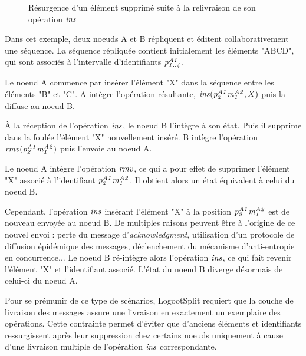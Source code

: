 \begin{figure}[!ht]
{
  }
  \caption{Résurgence d'un élément supprimé suite à la relivraison de son opération $\mathit{ins}$}
  \label{fig:why-exactly-once-delivery}
\end{figure}

Dans cet exemple, deux noeuds A et B répliquent et éditent collaborativement une séquence.
La séquence répliquée contient initialement les éléments "ABCD", qui sont associés à l'intervalle d'identifiants $\mathit{p}^{\mathit{A1}}_{\mathit{1..4}}$.

Le noeud A commence par insérer l'élément "X" dans la séquence entre les éléments "B" et "C".
A intègre l'opération résultante, $\mathit{ins}(\mathit{p}^{\mathit{A1}}_{\mathit{2}}\mathit{m}^{\mathit{A2}}_{\mathit{1}},X)$ puis la diffuse au noeud B.

À la réception de l'opération $\mathit{ins}$, le noeud B l'intègre à son état.
Puis il supprime dans la foulée l'élément "X" nouvellement inséré.
B intègre l'opération $\mathit{rmv}(\mathit{p}^{\mathit{A1}}_{\mathit{2}}\mathit{m}^{\mathit{A2}}_{\mathit{1}})$ puis l'envoie au noeud A.

Le noeud A intègre l'opération $\mathit{rmv}$, ce qui a pour effet de supprimer l'élément "X" associé à l'identifiant $\mathit{p}^{\mathit{A1}}_{\mathit{2}}\mathit{m}^{\mathit{A2}}_{\mathit{1}}$.
Il obtient alors un état équivalent à celui du noeud B.

Cependant, l'opération $\mathit{ins}$ insérant l'élément "X" à la position $\mathit{p}^{\mathit{A1}}_{\mathit{2}}\mathit{m}^{\mathit{A2}}_{\mathit{1}}$ est de nouveau envoyée au noeud B.
De multiples raisons peuvent être à l'origine de ce nouvel envoi : perte du message d'\emph{acknowledgment}, utilisation d'un protocole de diffusion épidémique des messages, déclenchement du mécanisme d'anti-entropie en concurrence...
Le noeud B ré-intègre alors l'opération $\mathit{ins}$, ce qui fait revenir l'élément "X" et l'identifiant associé.
L'état du noeud B diverge désormais de celui-ci du noeud A.

Pour se prémunir de ce type de scénarios, LogootSplit requiert que la couche de livraison des messages assure une livraison en exactement un exemplaire des opérations.
Cette contrainte permet d'éviter que d'anciens éléments et identifiants ressurgissent après leur suppression chez certains noeuds uniquement à cause d'une livraison multiple de l'opération $\mathit{ins}$ correspondante.
